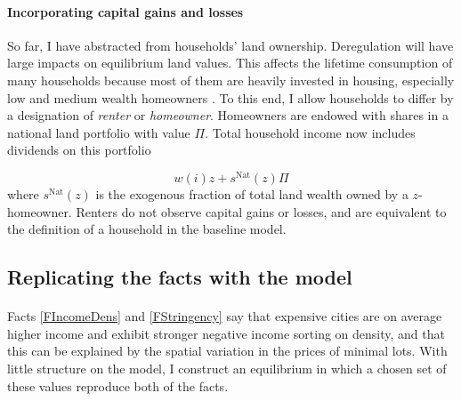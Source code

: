 \documentclass[12pt]{article}
\begin{document}
	\paragraph*{Incorporating capital gains and losses} So far, I have abstracted from households' land ownership. Deregulation will have large impacts on equilibrium land values. This affects the lifetime consumption of many households because most of them are heavily invested in housing, especially low and medium wealth homeowners \citep{Greaney}. To this end, I allow households to differ by a designation of \textit{renter} or \textit{homeowner}. Homeowners are endowed with shares in a national land portfolio with value $\Pi$. Total household income now includes dividends on this portfolio
	
	\begin{equation}\label{eq:CapGainsandLosses}
		w(i)z + s^{\text{Nat}}(z)\Pi
	\end{equation}
	where $s^{\text{Nat}}(z)$ is the exogenous fraction of total land wealth owned by a $z$-homeowner. Renters do not observe capital gains or losses, and are equivalent to the definition of a household in the baseline model.  
	
	\subsection{Replicating the facts with the model}\label{SubSection:ReplicatingFacts}
		
	\paragraph*{}
	Facts \ref{FIncomeDens} and \ref{FStringency} say that expensive cities are on average higher income and exhibit stronger negative income sorting on density, and that this can be explained by the spatial variation in the prices of minimal lots. With little structure on the model, I construct an equilibrium in which a chosen set of these values reproduce both of the facts. 
\end{document}
